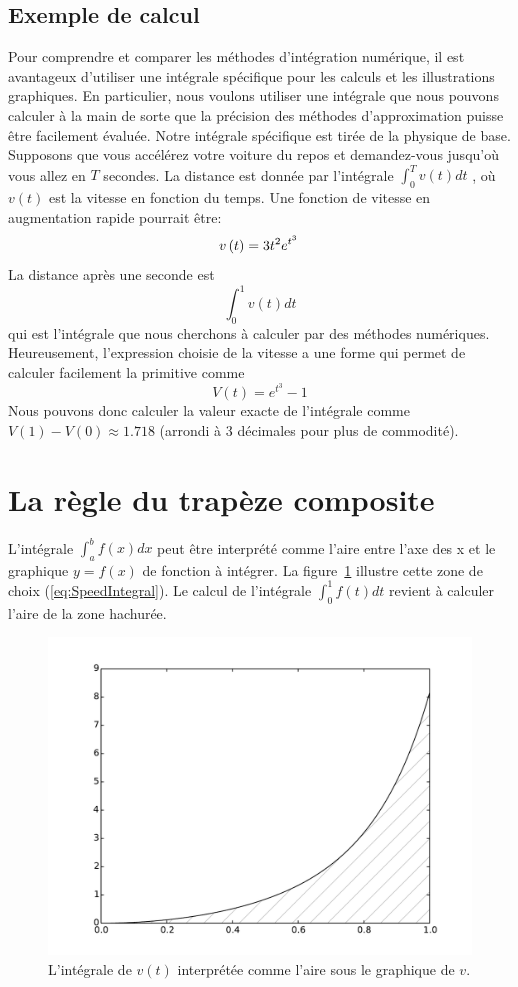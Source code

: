 \documentclass[%
oneside,                 %
final,                   %
10pt]{article}
\begin{document}
\subsection{Exemple de calcul}
Pour comprendre et comparer les méthodes d'intégration numérique, il est avantageux d'utiliser une intégrale spécifique pour les calculs et les illustrations graphiques. En particulier, nous voulons utiliser une intégrale que nous pouvons calculer à la main de sorte que la précision des méthodes d'approximation puisse être facilement évaluée. Notre intégrale spécifique est tirée de la physique de base. Supposons que vous accélérez votre voiture du repos et demandez-vous jusqu'où vous allez en $T$ secondes. La distance est donnée par l'intégrale $\int_0^T v(t)dt$ , où $v (t)$ est la vitesse en fonction du temps. Une fonction de vitesse en augmentation rapide pourrait être:
\begin{equation}
v\left(t\right) = 3t^{2}e^{t^3}\thinspace
\end{equation}
La distance après une seconde est
\begin{equation} \label{eq:SpeedIntegral}
\int_0^1 v(t)dt
\end{equation}
qui est l'intégrale que nous cherchons à calculer par des méthodes numériques. Heureusement, l'expression choisie de la vitesse a une forme qui permet de calculer facilement la primitive comme
\begin{equation}
V(t) = e^{t^3}-1
\end{equation}
Nous pouvons donc calculer la valeur exacte de l'intégrale comme $V (1) −V (0) ≈1.718$ (arrondi à 3 décimales pour plus de commodité).
\section{La règle du trapèze composite}
L'intégrale $\int_a^b f(x)dx$ peut être interprété comme l'aire entre l'axe des x et le graphique $y = f (x)$ de fonction à intégrer. La figure~\ref{fig:integral_of_f} illustre cette zone de choix (\ref{eq:SpeedIntegral}). Le calcul de l'intégrale $\int_0^1f(t)dt$ revient à calculer l'aire de la zone hachurée.

\begin{figure}[!ht]  %
  \centerline{\includegraphics[width=0.7\linewidth]{imgs/integral_of_f.pdf}}
  \caption{
  L'intégrale de $v (t)$ interprétée comme l'aire sous le graphique de $v$. \label{fig:integral_of_f}
  }
\end{figure}
\end{document}
